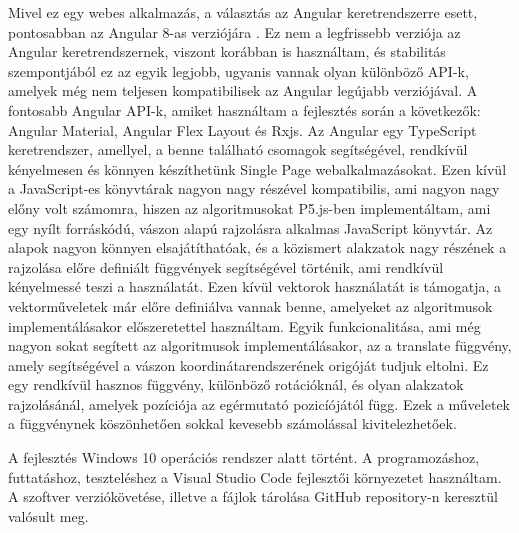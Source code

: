 Mivel ez egy webes alkalmazás, a választás az Angular keretrendszerre esett, pontosabban az Angular 8-as verziójára \cite{angular}. Ez nem a legfrissebb verziója az Angular keretrendszernek, viszont korábban is használtam, és stabilitás szempontjából ez az egyik legjobb, ugyanis vannak olyan különböző API-k, amelyek még nem teljesen kompatibilisek az Angular legújabb verziójával. A fontosabb Angular API-k, amiket használtam a fejlesztés során a következők: Angular Material, Angular Flex Layout és Rxjs. Az Angular egy TypeScript keretrendszer, amellyel, a benne található csomagok segítségével, rendkívül kényelmesen és könnyen készíthetünk Single Page webalkalmazásokat. Ezen kívül a JavaScript-es könyvtárak nagyon nagy részével kompatibilis, ami nagyon nagy előny volt számomra, hiszen az algoritmusokat P5.js-ben \cite{p5} implementáltam, ami egy nyílt forráskódú, vászon alapú rajzolásra alkalmas JavaScript könyvtár. Az alapok nagyon könnyen elsajátíthatóak, és a közismert alakzatok nagy részének a rajzolása előre definiált függvények segítségével történik, ami rendkívül kényelmessé teszi a használatát. Ezen kívül vektorok használatát is támogatja, a vektorműveletek már előre definiálva vannak benne, amelyeket az algoritmusok implementálásakor előszeretettel használtam. Egyik funkcionalitása, ami még nagyon sokat segített az algoritmusok implementálásakor, az a translate függvény, amely segítségével a vászon koordinátarendszerének origóját tudjuk eltolni. Ez egy rendkívül hasznos függvény, különböző rotációknál, és olyan alakzatok rajzolásánál, amelyek pozíciója az egérmutató pozicíójától függ. Ezek a műveletek a függvénynek köszönhetően sokkal kevesebb számolással kivitelezhetőek.
\par
A fejlesztés Windows 10 operációs rendszer alatt történt. A programozáshoz, futtatáshoz, teszteléshez a Visual Studio Code fejlesztői környezetet használtam. A szoftver verziókövetése, illetve a fájlok tárolása GitHub repository-n keresztül valósult meg.
